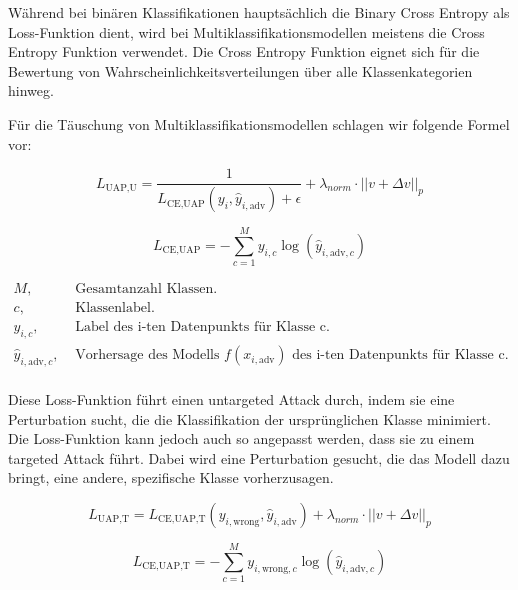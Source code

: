 Während bei binären Klassifikationen hauptsächlich die Binary Cross Entropy als Loss-Funktion dient, wird bei Multiklassifikationsmodellen meistens die Cross Entropy Funktion verwendet. Die Cross Entropy Funktion eignet sich für die Bewertung von Wahrscheinlichkeitsverteilungen über alle Klassenkategorien hinweg.

\newpage

Für die Täuschung von Multiklassifikationsmodellen schlagen wir folgende Formel vor:

\begin{equation}
    L_{\text{UAP,U}} = \frac{1}{L_{\text{CE,UAP}}(y_i, \hat{y}_{i,\text{adv}}) + \epsilon} + \lambda_{norm} \cdot ||v + \Delta v||_p 
\label{eq:Loss L_UAP_CE}
\end{equation}

\begin{equation}
L_{\text{CE,UAP}} = -\sum_{c=1}^My_{i,c}\log(\hat{y}_{i,\text{adv},c})
\label{eq:Loss L_CE_UAP}
\end{equation}

\begin{align*}
M,                &\text{ Gesamtanzahl Klassen.} \\
c,                &\text{ Klassenlabel.} \\
y_{i,c},          &\text{ Label des i-ten Datenpunkts für Klasse c.} \\
\hat{y}_{i,\text{adv},c},    &\text{ Vorhersage des Modells $f(x_{i,\text{adv}})$ des i-ten Datenpunkts für Klasse c.} \\
\end{align*}

Diese Loss-Funktion führt einen untargeted Attack durch, indem sie eine Perturbation sucht, die die Klassifikation der ursprünglichen Klasse minimiert. Die Loss-Funktion kann jedoch auch so angepasst werden, dass sie zu einem targeted Attack führt. Dabei wird eine Perturbation gesucht, die das Modell dazu bringt, eine andere, spezifische Klasse vorherzusagen.

\begin{equation}
    L_{\text{UAP,T}} = L_{\text{CE,UAP,T}}(y_{i,\text{wrong}}, \hat{y}_{i,\text{adv}}) + \lambda_{norm} \cdot ||v + \Delta v||_p 
\label{eq:Loss L_UAP_CE_Targeted}
\end{equation}

\begin{equation}
L_{\text{CE,UAP,T}} = -\sum_{c=1}^M y_{i,\text{wrong},c}\log(\hat{y}_{i,\text{adv},c})
\label{eq:Loss L_CE}
\end{equation}

